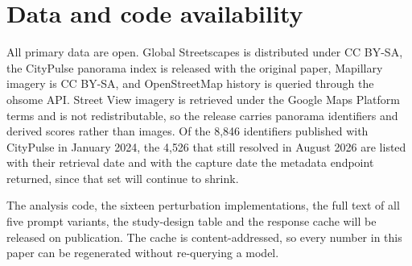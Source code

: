 \section*{Data and code availability}

All primary data are open. Global Streetscapes is distributed under CC BY-SA,
the CityPulse panorama index is released with the original paper, Mapillary
imagery is CC BY-SA, and OpenStreetMap history is queried through the ohsome
API. Street View imagery is retrieved under the Google Maps Platform terms and
is not redistributable, so the release carries panorama identifiers and derived
scores rather than images. Of the 8{,}846 identifiers published with CityPulse
in January 2024, the 4{,}526 that still resolved in August 2026 are listed with
their retrieval date and with the capture date the metadata endpoint returned,
since that set will continue to shrink.

The analysis code, the sixteen perturbation implementations, the full text of
all five prompt variants, the study-design table and the response cache will be
released on publication.
The cache is content-addressed, so every number in this paper can be regenerated
without re-querying a model.
